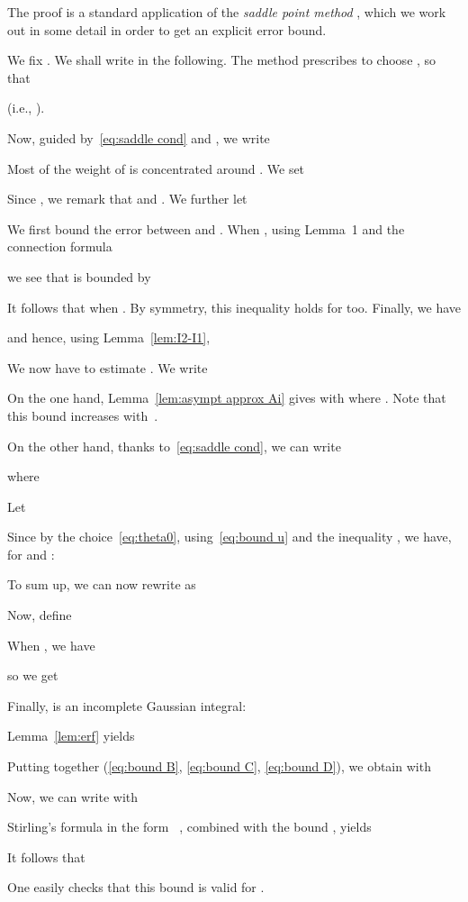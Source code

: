 \documentclass[10pt, conference]{IEEEtran}
\begin{document}
\begin{IEEEproof}
  The proof is a standard application of the {\emph{saddle point method}}
\cite[{\S}VIII.3]{FlajoletSedgewick2009}, which we work out in
  some detail in order to get an explicit error bound.

  We fix . We shall write  in the following.
  The method prescribes to choose , so that
  
  (i.e., ).

  Now, guided by~\eqref{eq:saddle cond} and , we write
  
  Most of the weight of  is concentrated around . We set
  
  Since , we remark that  and .
  We further let
  

  We first bound the error between  and . When ,
  using Lemma~1 and the connection formula~{\cite[Eq. 9.2.12]{DLMF}}
  
  we see that {} is
  bounded by
  
  It follows that  when .
  By symmetry, this inequality holds for  too.
Finally, we have
  
  and hence, using Lemma~\ref{lem:I2-I1},
  

  We now have to estimate . We write
  
  On the one hand, Lemma~\ref{lem:asympt approx Ai} gives
   with
   where .
  Note that this bound increases with~.

  On the other hand, thanks to~\eqref{eq:saddle cond}, we can write
  
  where
  
  Let
  
  Since  by the
  choice~\eqref{eq:theta0}, using~\eqref{eq:bound u} and the
  inequality , we
  have, for  and :
  
  To sum up, we can now rewrite  as
  

  Now, define
  
  When , we have
  
  so we get
  
  Finally,  is an incomplete Gaussian integral:
  
  Lemma~\ref{lem:erf} yields
  
  Putting together (\ref{eq:bound B}, \ref{eq:bound C},
  \ref{eq:bound D}), we obtain  with
  

  Now, we can write  with
  
  Stirling's formula in the form~\cite{Robbins1955}
  ,
  combined with the bound
  ,
  yields
  
  It follows that
  
  One easily checks that this bound is valid for
  .
\end{IEEEproof}
\end{document}
